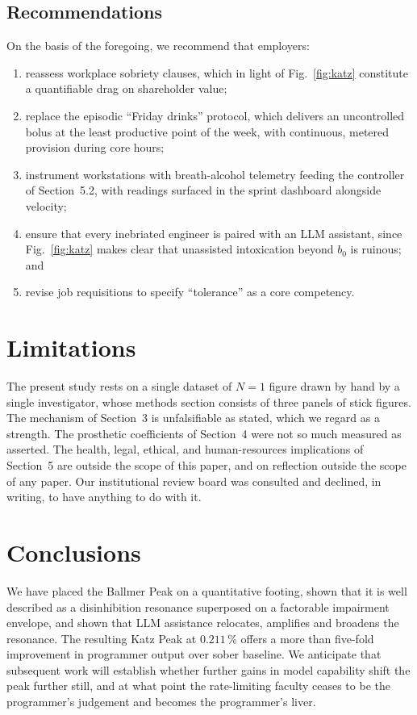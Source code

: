 \documentclass[11pt]{article}
\newcommand{\pct}{\,\%}
\begin{document}
\subsection{Recommendations}

On the basis of the foregoing, we recommend that employers:
\begin{enumerate}
\item reassess workplace sobriety clauses, which in light of Fig.~\ref{fig:katz} constitute a quantifiable drag on shareholder value;
\item replace the episodic ``Friday drinks'' protocol, which delivers an uncontrolled bolus at the least productive point of the week, with continuous, metered provision during core hours;
\item instrument workstations with breath-alcohol telemetry feeding the controller of Section~5.2, with readings surfaced in the sprint dashboard alongside velocity;
\item ensure that every inebriated engineer is paired with an LLM assistant, since Fig.~\ref{fig:katz} makes clear that unassisted intoxication beyond $b_0$ is ruinous; and
\item revise job requisitions to specify ``tolerance'' as a core competency.
\end{enumerate}

\section{Limitations}

The present study rests on a single dataset of $N = 1$ figure drawn by hand by a single investigator, whose methods section consists of three panels of stick figures. The mechanism of Section~3 is unfalsifiable as stated, which we regard as a strength. The prosthetic coefficients of Section~4 were not so much measured as asserted. The health, legal, ethical, and human-resources implications of Section~5 are outside the scope of this paper, and on reflection outside the scope of any paper. Our institutional review board was consulted and declined, in writing, to have anything to do with it.

\section{Conclusions}

We have placed the Ballmer Peak on a quantitative footing, shown that it is well described as a disinhibition resonance superposed on a factorable impairment envelope, and shown that LLM assistance relocates, amplifies and broadens the resonance. The resulting Katz Peak at $0.211\pct$ offers a more than five-fold improvement in programmer output over sober baseline. We anticipate that subsequent work will establish whether further gains in model capability shift the peak further still, and at what point the rate-limiting faculty ceases to be the programmer's judgement and becomes the programmer's liver.
\end{document}
